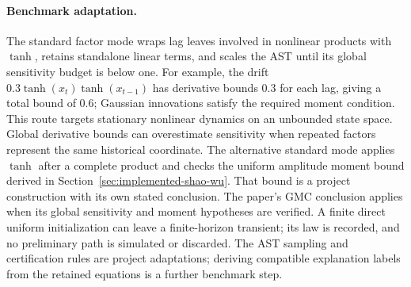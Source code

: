 \paragraph{Benchmark adaptation.}
The standard factor mode wraps lag leaves involved in nonlinear products
with $\tanh$, retains standalone linear terms, and scales the AST until
its global sensitivity budget is below one. For example, the drift
$0.3\tanh(x_t)\tanh(x_{t-1})$ has
derivative bounds $0.3$ for each lag, giving a total bound of $0.6$; Gaussian
innovations satisfy the required moment condition. This route targets
stationary nonlinear dynamics on an unbounded state space. Global derivative
bounds can overestimate sensitivity when repeated factors represent the
same historical coordinate. The alternative standard mode applies $\tanh$
after a complete product and checks the uniform amplitude moment bound
derived in Section~\ref{sec:implemented-shao-wu}. That bound is a project
construction with its own stated conclusion. The paper's GMC conclusion
applies when its global sensitivity and moment hypotheses are verified.
A finite
direct uniform initialization can leave a finite-horizon transient; its law
is recorded, and no preliminary path is simulated or discarded. The AST
sampling and certification rules are project adaptations; deriving compatible
explanation labels from the retained equations is a further benchmark step.
